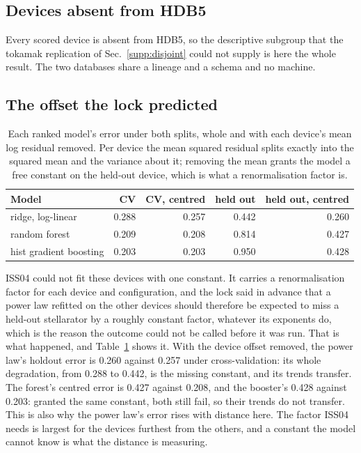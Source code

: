 \documentclass[12pt,letterpaper]{article}
\begin{document}
\subsection{Devices absent from HDB5}

Every scored device is absent from HDB5, so the descriptive subgroup that the
tokamak replication of Sec.~\ref{supp:disjoint} could not supply is here the whole result. The
two databases share a lineage and a schema and no machine.

\subsection{The offset the lock predicted}
\label{supp:ishcdb-offset}

\begin{table}[htbp]
\centering\small
\caption{Each ranked model's error under both splits, whole and with each
device's mean log residual removed. Per device the mean squared residual splits
exactly into the squared mean and the variance about it; removing the mean
grants the model a free constant on the held-out device, which is what a
renormalisation factor is.}
\label{tab:ishcdb-offset}
\begin{tabular}{lrrrr}
\toprule
Model & CV & CV, centred & held out & held out, centred \\
\midrule
ridge, log-linear & 0.288 & 0.257 & 0.442 & 0.260 \\
random forest & 0.209 & 0.208 & 0.814 & 0.427 \\
hist gradient boosting & 0.203 & 0.203 & 0.950 & 0.428 \\
\bottomrule
\end{tabular}
\par\smallskip{}
\end{table}

ISS04 could not fit these devices with one constant. It carries a
renormalisation factor for each device and configuration, and the lock said in
advance that a power law refitted on the other devices should therefore be
expected to miss a held-out stellarator by a roughly constant factor, whatever
its exponents do, which is the reason the outcome could not be called before it
was run. That is what happened, and Table~\ref{tab:ishcdb-offset} shows it. With the device offset removed, the power law's
holdout error is 0.260 against
0.257 under cross-validation: its whole
degradation, from 0.288 to
0.442, is the missing constant, and its
trends transfer. The forest's centred error is
0.427 against
0.208, and the booster's
0.428 against
0.203: granted the same constant,
both still fail, so their trends do not transfer. This is also why the power
law's error rises with distance here. The factor ISS04 needs is largest for the
devices furthest from the others, and a constant the model cannot know is what
the distance is measuring.
\end{document}
